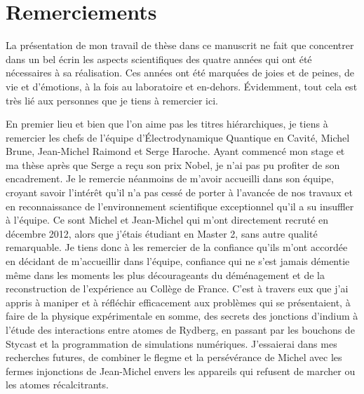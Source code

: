 \chapter*{Remerciements}

La présentation de mon travail de thèse dans ce manuscrit ne fait que concentrer dans un bel écrin les aspects scientifiques des quatre années qui ont été nécessaires à sa réalisation.
Ces années ont été marquées de joies et de peines, de vie et d'émotions, à la fois au laboratoire et en-dehors.
Évidemment, tout cela est très lié aux personnes que je tiens à remercier ici.

\bigskip
En premier lieu et bien que l'on aime pas les titres hiérarchiques, je tiens à remercier les \og chefs \fg{} de l'équipe d'Électrodynamique Quantique en Cavité, Michel Brune, Jean-Michel Raimond et Serge Haroche.
Ayant commencé mon stage et ma thèse après que Serge a reçu son prix Nobel, je n'ai pas pu profiter de son encadrement.
Je le remercie néanmoins de m'avoir accueilli dans son équipe, croyant savoir l'intérêt qu'il n'a pas cessé de porter à l'avancée de nos travaux et en reconnaissance de l'environnement scientifique exceptionnel qu'il a su insuffler à l'équipe.
Ce sont Michel et Jean-Michel qui m'ont directement recruté en décembre 2012, alors que j'étais étudiant en Master 2, sans autre qualité remarquable.
Je tiens donc à les remercier de la confiance qu'ils m'ont accordée en décidant de m'accueillir dans l'équipe, confiance qui ne s'est jamais démentie même dans les moments les plus décourageants du déménagement et de la reconstruction de l'expérience au Collège de France.
C'est à travers eux que j'ai appris à \og maniper \fg{} et à réfléchir efficacement aux problèmes qui se présentaient, à faire de la physique expérimentale en somme, des secrets des jonctions d'indium à l'étude des interactions entre atomes de Rydberg, en passant par les bouchons de Stycast et la programmation de simulations numériques.
J'essaierai dans mes recherches futures, de combiner le flegme et la persévérance de Michel avec les fermes injonctions de Jean-Michel envers les appareils qui refusent de marcher ou les atomes récalcitrants.

